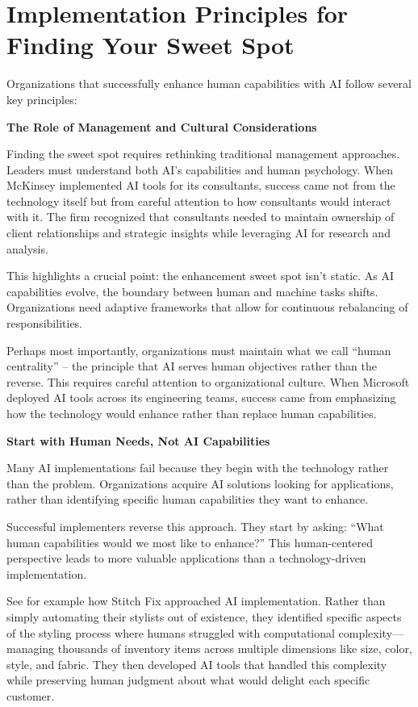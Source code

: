 \documentclass[
  Letterpaper,
]{scrbook}
\begin{document}
\section{Implementation Principles for Finding Your Sweet
Spot}\label{implementation-principles-for-finding-your-sweet-spot}

Organizations that successfully enhance human capabilities with AI
follow several key principles:

\textbf{The Role of Management and Cultural Considerations}

Finding the sweet spot requires rethinking traditional management
approaches. Leaders must understand both AI's capabilities and human
psychology. When McKinsey implemented AI tools for its consultants,
success came not from the technology itself but from careful attention
to how consultants would interact with it. The firm recognized that
consultants needed to maintain ownership of client relationships and
strategic insights while leveraging AI for research and analysis.

This highlights a crucial point: the enhancement sweet spot isn't
static. As AI capabilities evolve, the boundary between human and
machine tasks shifts. Organizations need adaptive frameworks that allow
for continuous rebalancing of responsibilities.

Perhaps most importantly, organizations must maintain what we call
``human centrality'' -- the principle that AI serves human objectives
rather than the reverse. This requires careful attention to
organizational culture. When Microsoft deployed AI tools across its
engineering teams, success came from emphasizing how the technology
would enhance rather than replace human capabilities.

\textbf{Start with Human Needs, Not AI Capabilities}

Many AI implementations fail because they begin with the technology
rather than the problem. Organizations acquire AI solutions looking for
applications, rather than identifying specific human capabilities they
want to enhance.

Successful implementers reverse this approach. They start by asking:
``What human capabilities would we most like to enhance?'' This
human-centered perspective leads to more valuable applications than a
technology-driven implementation.

See for example how Stitch Fix approached AI implementation. Rather than
simply automating their stylists out of existence, they identified
specific aspects of the styling process where humans struggled with
computational complexity---managing thousands of inventory items across
multiple dimensions like size, color, style, and fabric. They then
developed AI tools that handled this complexity while preserving human
judgment about what would delight each specific customer.
\end{document}
